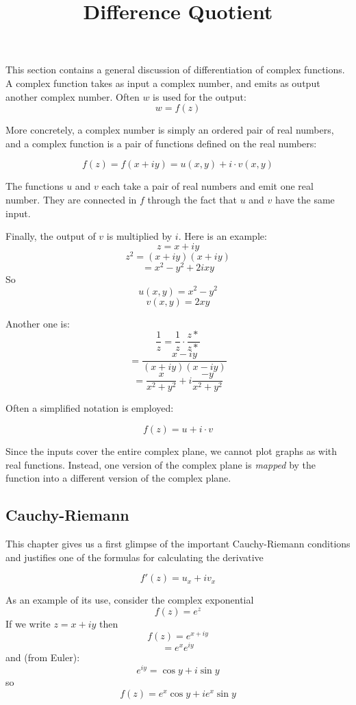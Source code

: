 \documentclass[11pt, oneside]{article}
\title{Difference Quotient}
\date{}
\begin{document}
\maketitle
\Large


This section contains a general discussion of differentiation of complex functions.  A complex function takes as input a complex number, and emits as output another complex number.  Often $w$ is used for the output:
\[ w = f(z) \]

More concretely, a complex number is simply an ordered pair of real numbers, and a complex function is a pair of functions defined on the real numbers:

\[ f(z) = f(x + iy) = u(x,y) + i \cdot v(x,y) \]

The functions $u$ and $v$ each take a pair of real numbers and emit one real number.  They are connected in $f$ through the fact that $u$ and $v$ have the same input.

Finally, the output of $v$ is multiplied by $i$.  Here is an example:
\[ z = x + iy \]
\[ z^2 = (x + iy)(x + iy) \]
\[ = x^2 - y^2 + 2ixy \]
So
\[ u(x,y) = x^2 - y^2 \]
\[ v(x,y) = 2xy \]

Another one is:
\[ \frac{1}{z} = \frac{1}{z} \cdot \frac{z*}{z*} \]
\[ = \frac{x - iy}{(x + iy)(x - iy)} \]
\[ = \frac{x}{x^2 + y^2} + i \frac{-y}{x^2 + y^2} \]

Often a simplified notation is employed:

\[ f(z) = u + i \cdot v \]

Since the inputs cover the entire complex plane, we cannot plot graphs as with real functions.  Instead, one version of the complex plane is \emph{mapped} by the function into a different version of the complex plane.

\subsection*{Cauchy-Riemann}

This chapter gives us a first glimpse of the important Cauchy-Riemann conditions and justifies one of the formulas for calculating the derivative

\[ f'(z) = u_x + i v_x \]

As an example of its use, consider the complex exponential
\[ f(z) = e^z \]
If we write $z = x + iy$ then
\[ f(z) = e^{x + iy} \]
\[ = e^x e^{iy} \]
and (from Euler):
\[ e^{iy} = \cos y + i \sin y \]
so
\[ f(z) = e^x \cos y + i e^x \sin y \]
\end{document}
